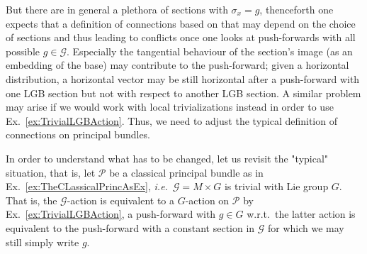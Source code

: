 \documentclass[a4paper,oneside,11pt,bibliography=totoc]{scrartcl}
\theoremstyle{plain}
\theoremstyle{remark}
\theoremstyle{definition}
\begin{document}
\begin{center}
\end{center}

But there are in general a plethora of sections with $\sigma_x= g$, thenceforth one expects that a definition of connections based on that may depend on the choice of sections and thus leading to conflicts once one looks at push-forwards with all possible $g \in \mathcal{G}$. Especially the tangential behaviour of the section's image (as an embedding of the base) may contribute to the push-forward; given a horizontal distribution, a horizontal vector may be still horizontal after a push-forward with one LGB section but not with respect to another LGB section. A similar problem may arise if we would work with local trivializations instead in order to use Ex.\ \ref{ex:TrivialLGBAction}. Thus, we need to adjust the typical definition of connections on principal bundles.

In order to understand what has to be changed, let us revisit the "typical" situation, that is, let $\mathcal{P}$ be a classical principal bundle as in Ex.\ \ref{ex:TheCLassicalPrincAsEx}, \textit{i.e.}\ $\mathcal{G} = M \times G$ is trivial with Lie group $G$. That is, the $\mathcal{G}$-action is equivalent to a $G$-action on $\mathcal{P}$ by Ex.\ \ref{ex:TrivialLGBAction}, a push-forward with $g \in G$ w.r.t.\ the latter action is equivalent to the push-forward with a constant section in $\mathcal{G}$ for which we may still simply write $g$.
\end{document}
